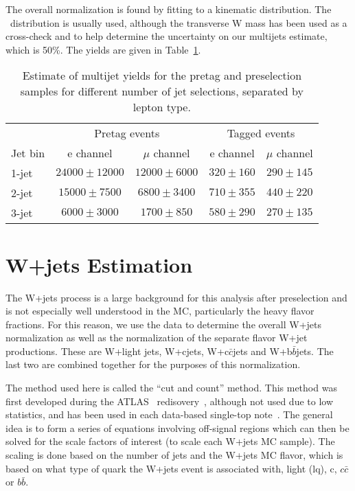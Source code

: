 The overall normalization is found by fitting to a kinematic distribution.  The \met~distribution is usually used, although the transverse W mass has been used as a cross-check and to help determine the uncertainty on our multijets estimate, which is 50\%.  The yields are given in Table~\ref{tab:QCD}.

\begin{table}[!h]
  \begin{center}
    \begin{tabular}{lcccc}
      \hline
      \hline
      & \multicolumn{2}{c}{Pretag events} & \multicolumn{2}{c}{Tagged events} \\
      Jet bin & e channel & $\mu$ channel & e channel & $\mu$ channel \\
      \hline
      1-jet & $ 24000 \pm 12000$ & $ 12000 \pm 6000 $   & $ 320 \pm 160  $ & $ 290 \pm 145$ \\
      2-jet & $ 15000  \pm 7500$ & $ 6800 \pm 3400 $   & $ 710 \pm 355  $ & $ 440 \pm 220$ \\
      3-jet & $ 6000  \pm 3000$ & $ 1700 \pm 850 $    & $ 580 \pm 290  $ & $ 270  \pm 135 $ \\
      \hline
      \hline
    \end{tabular}
    \caption{\label{tab:QCD} Estimate of multijet yields for the pretag and preselection samples for different number of jet selections, separated by lepton type.}
  \end{center}
\end{table}

\section{W+jets Estimation}\label{sec:wjets} 
The W+jets process is a large background for this analysis after preselection and is not especially well understood in the MC, particularly the heavy flavor fractions.  For this reason, we use the data to determine the overall W+jets normalization as well as the normalization of the separate flavor W+jet productions. These are W+light jets, W+cjets, W+c$\bar{c}$jets and W+b$\bar{b}$jets.  The last two are combined together for the purposes of this normalization.  

The method used here is called the ``cut and count'' method.  This method was first developed during the ATLAS \ttbar~redisovery~\cite{ttbarPaper}, although not used due to low statistics, and has been used in each data-based single-top note~\cite{ATLAS-CONF-2011-027,ATLAS-CONF-2011-088,ATLAS-CONF-2011-101}.  The general idea is to form a series of equations involving off-signal regions which can then be solved for the scale factors of interest (to scale each W+jets MC sample).  The scaling is done based on the number of jets and the W+jets MC flavor, which is based on what type of quark the W+jets event is associated with, light (lq), c, $c\bar{c}$ or  $b\bar{b}$.

